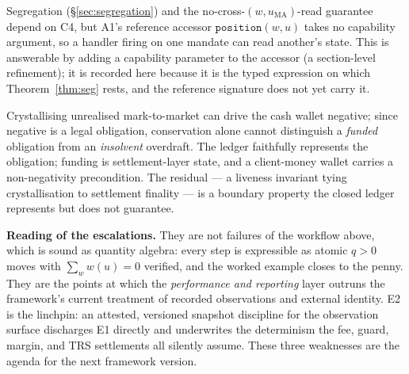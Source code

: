 \documentclass[11pt,a4paper]{article}
\begin{document}
\begin{description}[leftmargin=0pt,style=nextline]
\item[\textbf{E4 --- C4 capability scoping is asserted, not typed.}]
Segregation (\S\ref{sec:segregation}) and the no-cross-$(w,u_{\mathrm{MA}})$-read guarantee depend
on C4, but A1's reference accessor $\texttt{position}(w,u)$ takes no capability argument, so a
handler firing on one mandate can read another's state. This is answerable by adding a capability
parameter to the accessor (a section-level refinement); it is recorded here because it is the typed
expression on which Theorem~\ref{thm:seg} rests, and the reference signature does not yet carry it.

\item[\textbf{E5 --- No in-ledger solvency liveness.}]
Crystallising unrealised mark-to-market can drive the cash wallet negative; since negative is a
legal obligation, conservation alone cannot distinguish a \emph{funded} obligation from an
\emph{insolvent} overdraft. The ledger faithfully represents the obligation; funding is
settlement-layer state, and a client-money wallet carries a non-negativity precondition. The
residual --- a liveness invariant tying crystallisation to settlement finality --- is a boundary
property the closed ledger represents but does not guarantee.
\end{description}

\noindent\textbf{Reading of the escalations.} They are not failures of the workflow above, which is
sound as quantity algebra: every step is expressible as atomic $q>0$ moves with $\sum_w w(u)=0$
verified, and the worked example closes to the penny. They are the points at which the
\emph{performance and reporting} layer outruns the framework's current treatment of recorded
observations and external identity. E2 is the linchpin: an attested, versioned snapshot discipline
for the observation surface discharges E1 directly and underwrites the determinism the fee, guard,
margin, and TRS settlements all silently assume. These three weaknesses are the agenda for the next
framework version.
\end{document}
